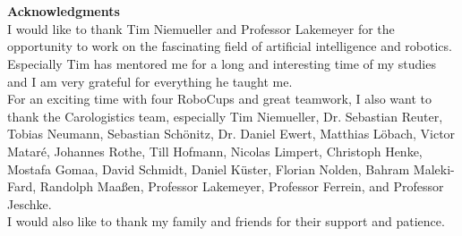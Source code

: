 \newpage

\section*{} 
\vspace{4cm}
\textbf{\noindent \Huge Acknowledgments}
\vspace{1cm}\\
\noindent
I would like to thank Tim Niemueller and Professor Lakemeyer for the
opportunity to work on the fascinating field of artificial
intelligence and robotics. Especially Tim has mentored me for a long
and interesting time of my studies and I am very grateful for
everything he taught me.\\ For an exciting time with four RoboCups and
great teamwork, I also want to thank the Carologistics team,
especially Tim Niemueller, Dr. Sebastian Reuter, Tobias Neumann,
Sebastian Schönitz, Dr. Daniel Ewert, Matthias Löbach, Victor
Matar\'{e}, Johannes Rothe, Till Hofmann, Nicolas Limpert, Christoph
Henke, Mostafa Gomaa, David Schmidt, Daniel Küster, Florian Nolden,
Bahram Maleki-Fard, Randolph Maaßen, Professor Lakemeyer, Professor
Ferrein, and Professor Jeschke.\\ I would also
like to thank my family and friends for their support and patience.

